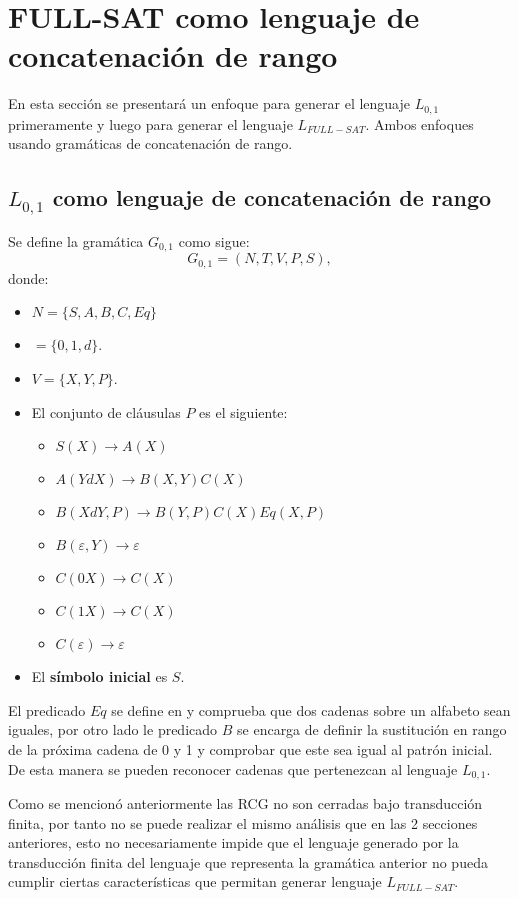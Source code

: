 \documentclass{article}
\begin{document}
\section{FULL-SAT como lenguaje de concatenación de rango}

En esta sección se presentará un enfoque para generar el lenguaje $L_{0,1}$ primeramente y luego para generar el lenguaje $L_{FULL-SAT}$.
Ambos enfoques usando gramáticas de concatenación de rango.

\subsection{$L_{0,1}$ como lenguaje de concatenación de rango}

Se define la gramática $G_{0,1}$ como sigue:
\[
    G_{0,1} = (N, T, V, P, S),
\]
donde:

\begin{itemize}
    \item $N=\{S,A,B,C,Eq\}$
    \item $=\{0,1,d\}$.
    \item $V=\{X,Y,P\}$.
    \item El conjunto de cláusulas $P$ es el siguiente:
          \begin{itemize}
              \item  $S(X)\to A(X)$
              \item $A(YdX)\to B(X,Y)C(X)$
              \item $B(XdY,P)\to B(Y,P) C(X) Eq(X,P)$
              \item $B(\varepsilon,Y)\to \varepsilon$
              \item $C(0X)\to C(X)$
              \item $C(1X)\to C(X)$
              \item $C(\varepsilon)\to \varepsilon$
          \end{itemize}
    \item El \textbf{símbolo inicial} es $S$.
\end{itemize}

El predicado $Eq$ se define en \cite{mainRCGBib} y comprueba que dos cadenas sobre un alfabeto sean iguales, por otro lado 
le predicado $B$ se encarga de definir la sustitución en rango de la próxima cadena de 0 y 1 y comprobar que este sea igual
al patrón inicial. De esta manera se pueden reconocer cadenas que pertenezcan al lenguaje $L_{0,1}$.

Como se mencionó anteriormente las RCG no son cerradas bajo transducción finita, por tanto no se puede realizar el mismo 
análisis que en las 2 secciones anteriores, esto no necesariamente impide que el lenguaje generado por la transducción finita del lenguaje que 
representa la gramática anterior no pueda cumplir ciertas características que permitan generar lenguaje $L_{FULL-SAT}$. 
\end{document}
